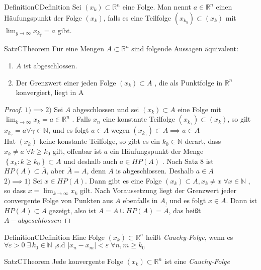 \documentclass[11.5 pt, a4paper]{memoir}
\begin{document}
\begin{ibox}{Definition}{CDefinition}
     Sei $ \left( x_k \right) \subset \mathbb{R}^n $ eine Folge. Man nennt $ a \in \mathbb{R}^n $ einen Häufungspunkt der Folge
	 $ \left( x_{k} \right)  $, falls es eine Teilfolge $ \left( x_{k_{y}} \right) \subset \left( x_{k} \right)  $ mit 
	 $ \lim_{y \to \infty }x_{k_{y}} = a  $ gibt.
\end{ibox}
\begin{ibox}[10]{Satz}{CTheorem}
    Für eine Mengen $ A \subset \mathbb{R}^n $ sind folgende Aussagen äquivalent:
	\begin{enumerate}[label=\alph*)]
		\item $ A $ ist abgeschlossen.	
		\item Der Grenzwert einer jeden Folge $ \left( x_{k} \right) \subset A $ , die als Punktfolge in $ \mathbb{R}^n $ konvergiert,
			liegt in A
	\end{enumerate}
\end{ibox}
\begin{proof}
	$ 1) \implies 2) $ Sei $ A $ abgeschlossen und sei $  \left( x_{k} \right) \subset A $ eine Folge mit $ \lim_{k \to \infty } x_k =
	a \in \mathbb{R}^n	$ . Falls $  x_n $ eine konstante Teilfolge $\left(  x_{k_{ \gamma} } \right) \subset \left( x_k \right)  $,
	so gilt $ x_{k_{ \gamma}} = a \forall \gamma \in \mathbb{N} $, und es folgt $ a \in A $ wegen $ \left( x_{k_{ \gamma}} \right) 
	\subset A  \implies a \in A $ \\
	Hat $ \left( x_k \right) $ keine konstante Teilfolge, so gibt es ein $ k_0 \in \mathbb{N} $ derart, dass $ x_k \neq a \; \forall
	k \geq k_0$ gilt, offenbar ist $ a $  ein Häufungspunkt der Menge $ \left\{ x_{k}: k \geq k_0 \right\} \subset A $ und deshalb auch
	$ a \in HP(A) $ . Nach Satz 8 ist $ HP(A) \subset \overline{A} $, aber $ \overline{A} = A  $, denn $ A  $ is abgeschlossen. 
	Deshalb $ a \in A $ \\
	$ 2) \implies 1) $ Sei $ x \in HP(A) $. Dann gibt es eine Folge $ \left( x_k \right) \subset A, x_k \neq x \; \forall x \in \mathbb{N} $
	, so dass $ x = \lim_{k \to \infty}x_k $ gilt. Nach Voraussetzung liegt der Grenzwert jeder convergente Folge von Punkten aus $ A $ 
	ebenfalls in $ A $, und es folgt $ x \in A $. Dann ist $ HP(A) \subset A $ gezeigt, also ist $ A = A \cup HP(A) = \overline{A} $,
	das heißt $ A-abgeschlossen $ 
\end{proof}

\begin{ibox}{Definition}{CDefinition}
    Eine Folge $ \left( x_k \right)\subset\mathbb{R}^n$ heißt \textit{Cauchy-Folge}, wenn es $ \forall\varepsilon>0 \; \exists\, k_0 
	\in \mathbb{N} \text{ ,s.d } \left|x_n - x_m \right| < \varepsilon \;\forall n,m \geq k_0$ 
\end{ibox}
\begin{ibox}[11]{Satz}{CTheorem}
    Jede konvergente Folge $\left(  x_k  \right) \subset \mathbb{R}^n$ ist eine \textit{Cauchy-Folge}
\end{ibox}
\end{document}
